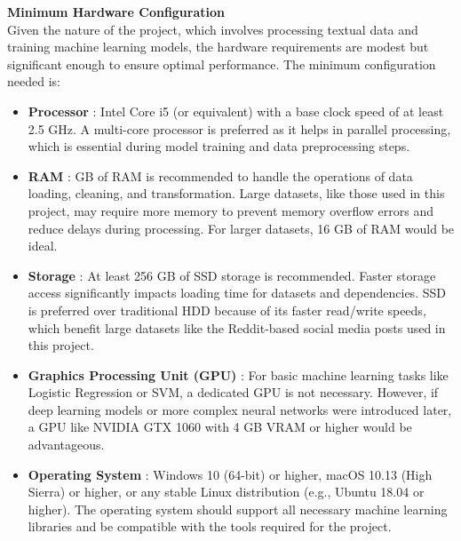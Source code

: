 \noindent
\textbf{Minimum Hardware Configuration} \\
\noindent
Given the nature of the project, which involves processing textual data and training machine learning models, the hardware requirements are modest but significant enough to ensure optimal performance. The minimum configuration needed is:
\begin{itemize}
    \item \textbf{Processor} :
    \noindent
    Intel Core i5 (or equivalent) with a base clock speed of at least 2.5 GHz. A multi-core processor is preferred as it helps in parallel processing, which is essential during model training and data preprocessing steps.
    \item \textbf{RAM} :
     GB of RAM is recommended to handle the operations of data loading, cleaning, and transformation. Large datasets, like those used in this project, may require more memory to prevent memory overflow errors and reduce delays during processing. For larger datasets, 16 GB of RAM would be ideal.
    \item \textbf{Storage} :
    \noindent
    At least 256 GB of SSD storage is recommended. Faster storage access significantly impacts loading time for datasets and dependencies. SSD is preferred over traditional HDD because of its faster read/write speeds, which benefit large datasets like the Reddit-based social media posts used in this project.
    \item \textbf{Graphics Processing Unit (GPU)} :
    \noindent
    For basic machine learning tasks like Logistic Regression or SVM, a dedicated GPU is not necessary. However, if deep learning models or more complex neural networks were introduced later, a GPU like NVIDIA GTX 1060 with 4 GB VRAM or higher would be advantageous.
    \item \textbf{Operating System} :
    \noindent
    Windows 10 (64-bit) or higher, macOS 10.13 (High Sierra) or higher, or any stable Linux distribution (e.g., Ubuntu 18.04 or higher). The operating system should support all necessary machine learning libraries and be compatible with the tools required for the project.
\end{itemize} 

